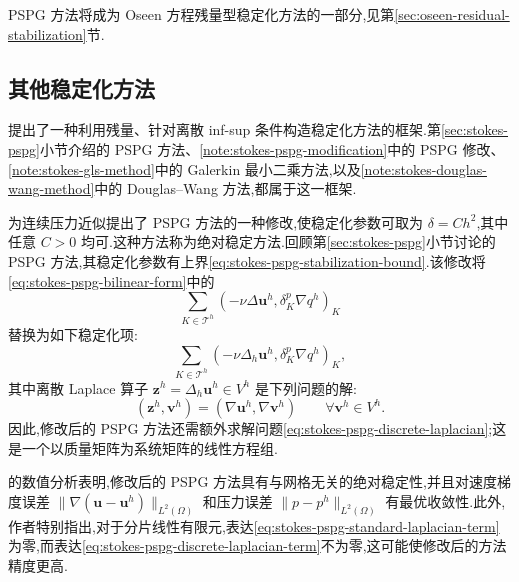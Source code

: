 \begin{note}\label{note:stokes-pspg-oseen-stabilization}
PSPG 方法将成为 Oseen 方程残量型稳定化方法的一部分,见第\hyperref[sec:oseen-residual-stabilization]{\ref*{sec:oseen-residual-stabilization}}节.
\end{note}

\subsection{其他稳定化方法}
\label{sec:stokes-other-stabilized-methods}

\begin{note}[基于残量的稳定化框架]\label{note:stokes-residual-stabilization-framework}
\textcite{BochevGunzburger2004} 提出了一种利用残量、针对离散 inf-sup 条件构造稳定化方法的框架.第\hyperref[sec:stokes-pspg]{\ref*{sec:stokes-pspg}}小节介绍的 PSPG 方法、\cref{note:stokes-pspg-modification}中的 PSPG 修改、\cref{note:stokes-gls-method}中的 Galerkin 最小二乘方法,以及\cref{note:stokes-douglas-wang-method}中的 Douglas--Wang 方法,都属于这一框架.
\end{note}

\begin{note}\label{note:stokes-pspg-modification}
\textcite{BochevGunzburger2004} 为连续压力近似提出了 PSPG 方法的一种修改,使稳定化参数可取为 $\delta=Ch^2$,其中任意 $C>0$ 均可.这种方法称为绝对稳定方法.回顾第\hyperref[sec:stokes-pspg]{\ref*{sec:stokes-pspg}}小节讨论的 PSPG 方法,其稳定化参数有上界\cref{eq:stokes-pspg-stabilization-bound}.该修改将\cref{eq:stokes-pspg-bilinear-form}中的
\begin{equation}\label{eq:stokes-pspg-standard-laplacian-term}
 \sum_{K\in\mathcal{T}^h}
   (-\nu\Delta\bm{u}^h,\delta_K^p\nabla q^h)_K
\end{equation}
替换为如下稳定化项:
\begin{equation}\label{eq:stokes-pspg-discrete-laplacian-term}
 \sum_{K\in\mathcal{T}^h}
   (-\nu\Delta_h\bm{u}^h,\delta_K^p\nabla q^h)_K,
\end{equation}
其中离散 Laplace 算子 $ \bm{z}^h=\Delta_h\bm{u}^h\in V^h$ 是下列问题的解:
\begin{equation}\label{eq:stokes-pspg-discrete-laplacian}
 (\bm{z}^h,\bm{v}^h)
 =(\nabla\bm{u}^h,\nabla\bm{v}^h)
 \qquad\forall\bm{v}^h\in V^h.
\end{equation}
因此,修改后的 PSPG 方法还需额外求解问题\cref{eq:stokes-pspg-discrete-laplacian};这是一个以质量矩阵为系统矩阵的线性方程组.

\textcite{BochevGunzburger2004} 的数值分析表明,修改后的 PSPG 方法具有与网格无关的绝对稳定性,并且对速度梯度误差 $\|\nabla(\bm{u}-\bm{u}^h)\|_{L^2(\Omega)}$ 和压力误差 $\|p-p^h\|_{L^2(\Omega)}$ 有最优收敛性.此外,作者特别指出,对于分片线性有限元,表达\cref{eq:stokes-pspg-standard-laplacian-term}为零,而表达\cref{eq:stokes-pspg-discrete-laplacian-term}不为零,这可能使修改后的方法精度更高.
\end{note}

